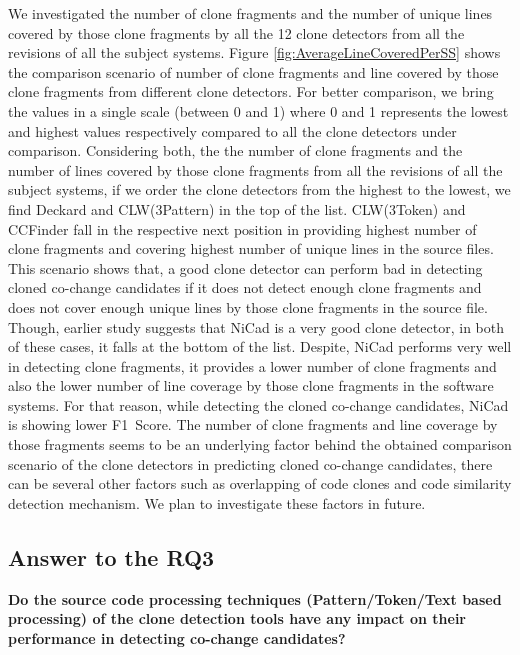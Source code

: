 \documentclass[review]{elsarticle}
\begin{document}
We investigated the number of clone fragments and the number of unique lines covered by those clone fragments by all the 12 clone detectors from all the revisions of all the subject systems. Figure \ref{fig:AverageLineCoveredPerSS}  shows the comparison scenario of number of clone fragments and line covered by those clone fragments from different clone detectors. For better comparison, we bring the values in a single scale (between 0 and 1) where 0 and 1 represents the lowest and highest values respectively compared to all the clone detectors under comparison. Considering both, the the number of clone fragments and the number of lines covered by those clone fragments from all the revisions of all the subject systems, if we order the clone detectors from the highest to the lowest, we find Deckard and CLW(3Pattern) in the top of the list. CLW(3Token) and CCFinder fall in the respective next position in providing highest number of clone fragments and covering highest number of unique lines in the source files. This scenario shows that, a good clone detector can perform bad in detecting cloned co-change candidates if it does not detect enough clone fragments and does not cover enough unique lines by those clone fragments in the source file. Though, earlier study \cite{Mondal-2014-PRC-2597073-2597104rankingCoChange} suggests that NiCad is a very good clone detector, in both of these cases, it falls at the bottom of the list. Despite, NiCad performs very well in detecting clone fragments, it provides a lower number of clone fragments and also the lower number of line coverage by those clone fragments in the software systems. For that reason, while detecting the cloned co-change candidates, NiCad is showing lower F1~Score. The number of clone fragments and line coverage by those fragments seems to be an underlying factor behind the obtained comparison scenario of the clone detectors in predicting cloned co-change candidates, there can be several other factors such as overlapping of code clones and code similarity detection mechanism. We plan to investigate these factors in future.

\subsection{Answer to the \textbf{RQ3}}
\textbf{Do the source code processing techniques (Pattern/Token/Text based processing) of the clone detection tools have any impact on their performance in detecting co-change candidates?}
\end{document}

